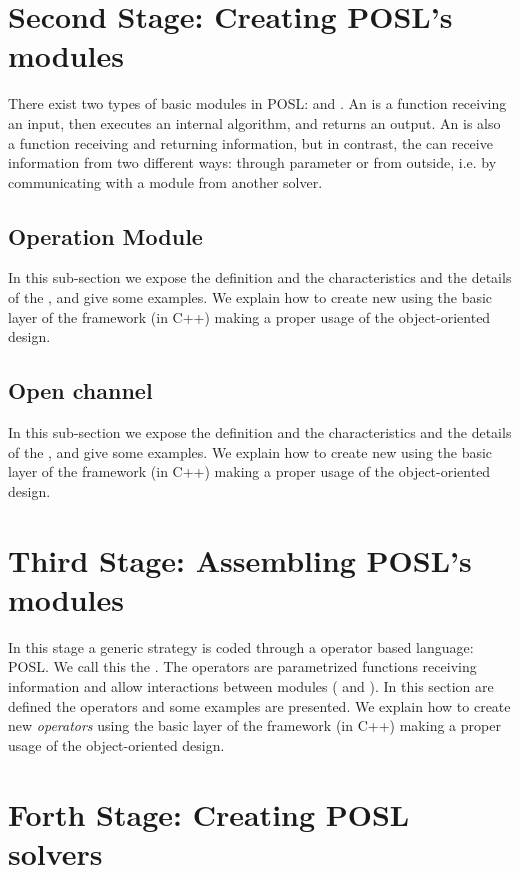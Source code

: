 \documentclass[a4paper]{book} %
\newcommand{\posl}{{\sc POSL}}
\begin{document}
\section{Second Stage: Creating \posl's modules}

There exist two types of basic modules in \posl: \oms{} and \opchs{}. An \om{} is a function receiving an input, then executes an internal algorithm, and returns an output. An \opch{} is also a function receiving and returning information, but in contrast, the \opch can receive information from two different ways: through parameter or from outside, i.e. by communicating with a module from another solver.

\subsection{Operation Module}

In this sub-section we expose the definition and the characteristics and the details of the \om, and give some examples. We explain how to create new \oms{} using the basic layer of the framework (in C++) making a proper usage of the object-oriented design.

\subsection{Open channel}

In this sub-section we expose the definition and the characteristics and the details of the \opch, and give some examples. We explain how to create new \opchs{} using the basic layer of the framework (in C++) making a proper usage of the object-oriented design.

\section{Third Stage: Assembling \posl's modules}

In this stage a generic strategy is coded through a operator based language: \posl. We call this the \cstr. The operators are parametrized functions receiving information and allow interactions between modules (\oms{} and \opchs). In this section are defined the operators and some examples are presented. We explain how to create new \textit{operators} using the basic layer of the framework (in C++) making a proper usage of the object-oriented design.

\section{Forth Stage: Creating \posl{} solvers}
\end{document}
